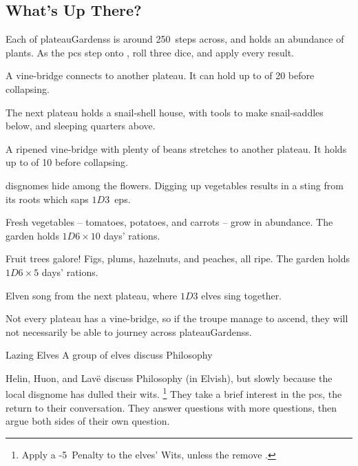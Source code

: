 \begin{multicols}{2}

\subsection{What's Up There?}

Each of \glspl{plateauGardens} is around 250~\glspl{step} across, and holds an abundance of plants.
As the \glspl{pc} step onto , roll three dice, and apply every result.

\begin{dlist}
  \item
  A vine-bridge connects to another plateau.
  It can hold up to  of 20 before collapsing.
  
  The next plateau holds a snail-shell house, with tools to make snail-saddles below, and sleeping quarters above.
  \item
  A ripened vine-bridge with plenty of beans stretches to another plateau.
  It holds up to  of 10 before collapsing.
  \item
  \Glspl{disgnome} hide among the flowers.
  Digging up vegetables results in a sting from its roots which saps $1D3$~\glspl{ep}.
  \item
  Fresh vegetables -- tomatoes, potatoes, and carrots -- grow in abundance.
  The garden holds $1D6 \times 10$ days' \glspl{ration}.
  \item
  Fruit trees galore!
  Figs, plums, hazelnuts, and peaches, all ripe.
  The garden holds $1D6 \times 5$ days' \glspl{ration}.
  \item
  Elven song from the next plateau, where $1D3$ elves sing together.
\end{dlist}

Not every plateau has a vine-bridge, so if the troupe manage to ascend, they will not necessarily be able to journey across \glspl{plateauGardens}.


{Lazing Elves}%
{A group of elves discuss Philosophy}%

Helin, Huon, and Lav\"e discuss Philosophy (in Elvish), but slowly because the local \gls{disgnome} has dulled their wits.%
\footnote{Apply a -5~Penalty to the elves' Wits, unless the  remove .}
They take a brief interest in the \glspl{pc}, the return to their conversation.
They answer questions with more questions, then argue both sides of their own question.


\end{multicols}
